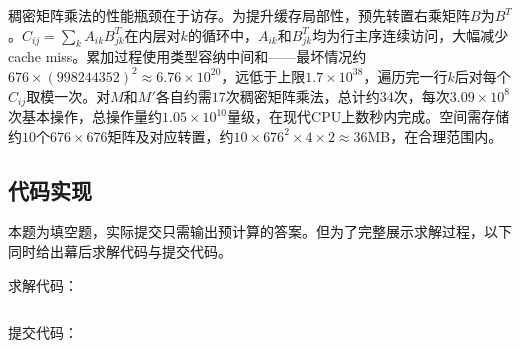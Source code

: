 稠密矩阵乘法的性能瓶颈在于访存。为提升缓存局部性，预先转置右乘矩阵$B$为$B^T$。$C_{ij}=\sum_k A_{ik}B^T_{jk}$在内层对$k$的循环中，$A_{ik}$和$B^T_{jk}$均为行主序连续访问，大幅减少cache miss。累加过程使用类型容纳中间和——最坏情况约$676\times (998244352)^2\approx 6.76\times 10^{20}$，远低于上限$1.7\times 10^{38}$，遍历完一行$k$后对每个$C_{ij}$取模一次。对$M$和$M'$各自约需$17$次稠密矩阵乘法，总计约$34$次，每次$3.09\times 10^8$次基本操作，总操作量约$1.05\times 10^{10}$量级，在现代CPU上数秒内完成。空间需存储约$10$个$676\times 676$矩阵及对应转置，约$10\times 676^2\times 4\times 2\approx 36$MB，在合理范围内。

\subsection{代码实现}

本题为填空题，实际提交只需输出预计算的答案。但为了完整展示求解过程，以下同时给出幕后求解代码与提交代码。

\medskip\noindent 求解代码：
\inputminted{c++}{../src/p02_circular_light_ring_solve.cpp}

\medskip\noindent 提交代码：
\inputminted{c++}{../src/p02_circular_light_ring.cpp}
